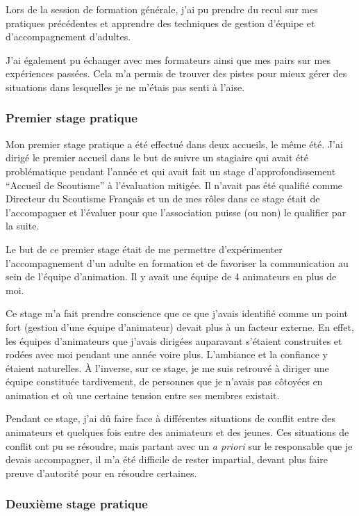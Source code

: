 \documentclass[titlepage,11pt,a4paper]{article}
\begin{document}
Lors de la session de formation générale, j'ai pu prendre du recul sur mes pratiques
précédentes et apprendre des techniques de gestion d'équipe et d'accompagnement
d'adultes.

J'ai également pu échanger avec mes formateurs ainsi que mes pairs sur mes expériences
passées. Cela m'a permis de trouver des pistes pour mieux gérer des situations dans lesquelles
je ne m'étais pas senti à l'aise.

\subsubsection{Premier stage pratique}

Mon premier stage pratique a été effectué dans deux accueils, le même été. J'ai dirigé le
premier accueil dans le but de suivre un stagiaire qui avait été problématique pendant
l'année et qui avait fait un stage d'approfondissement ``Accueil de Scoutisme'' à
l'évaluation mitigée. Il n'avait pas été qualifié comme Directeur du Scoutisme Français et
un de mes rôles dans ce stage était de l'accompagner et l'évaluer pour que l'association puisse (ou
non) le qualifier par la suite.

Le but de ce premier stage était de me permettre d'expérimenter l'accompagnement d'un
adulte en formation et de favoriser la communication au sein de l'équipe d'animation. Il y
avait une équipe de 4 animateurs en plus de moi.

Ce stage m'a fait prendre conscience que ce que j'avais identifié comme un point fort
(gestion d'une équipe d'animateur) devait plus à un facteur externe. En effet, les équipes
d'animateurs que j'avais dirigées auparavant s'étaient construites et rodées avec moi pendant
une année voire plus. L'ambiance et la confiance y étaient naturelles. À l'inverse, sur ce
stage, je me suis retrouvé à diriger une équipe constituée tardivement, de personnes que
je n'avais pas côtoyées en animation et où une certaine tension entre ses membres
existait.

Pendant ce stage, j'ai dû faire face à différentes situations de conflit entre des
animateurs et quelques fois entre des animateurs et des jeunes. Ces situations de conflit
ont pu se résoudre, mais partant avec un \textit{a priori} sur le responsable que je
devais accompagner, il m'a été difficile de rester impartial, devant plus faire preuve
d'autorité pour en résoudre certaines.

\subsubsection{Deuxième stage pratique}
\end{document}
